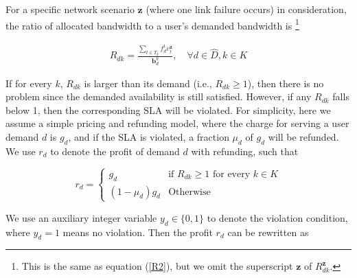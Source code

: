 \documentclass[sigconf]{acmart}
\begin{document}
For a specific network scenario $ \mathbf{z}$ (where one link failure occurs) in consideration, 
the ratio of allocated bandwidth to a user's demanded bandwidth is 
\footnote{This is the same as equation (\ref{R2}), but we omit the superscript $\mathbf{z}$ of $R_{dk}^\mathbf{z}$.}

\begin{small}
\begin{eqnarray} \label{B-return}
R_{dk}=\frac{\sum_{t\in T_k} f^{t}_{d} v_t^{\mathbf{z}}} {\mathbf{b}^k_d}, \quad \forall  d \in \hat{D},  k \in K
\end{eqnarray}
\end{small}



If for every $k$, $R_{dk}$ is larger than its demand (i.e., $R_{dk} \ge 1$), 
then there is no problem since the demanded availability is still satisfied. 
However, if any $R_{dk}$ falls below 1, then the corresponding SLA will be violated. 
For simplicity, here we assume a simple pricing and refunding model, 
where the charge for serving a user demand $d$ is $g_d$, and if the SLA is violated, 
a fraction $\mu_d$ of $g_d$ will be refunded. 
We use $r_d$ to denote the profit of demand $d$ with refunding, such that


\begin{equation*}
r_d=
\begin{cases}
g_d &\text{if $R_{dk} \ge 1$ for every $k \in K$}\\
(1-\mu_{d})g_d &\text{Otherwise}
\end{cases}
\label{availability222}
\end{equation*}



We use an auxiliary integer variable $y_d \in \{0, 1\}$ to denote the violation condition, 
where $y_d=1$ means no violation. 
Then the profit $r_d$ can be rewritten as 
\end{document}
